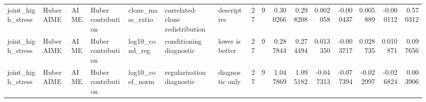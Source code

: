 \begin{table}[t]
\begin{tabular}{lllllllrrrrrrrrr}
joint_high_stress & HuberAIME & AIME & Huber contribution & clone_mass_ratio & correlated-clone redistribution & descriptive & 27 & 9 & 0.300266 & 0.298208 & 0.002058 & -0.000437 & 0.005889 & -0.000112 & 0.570312 \\
joint_high_stress & HuberAIME & AIME & Huber contribution & log10_cond_reg & conditioning diagnostic & lower is better & 27 & 9 & 0.287844 & 0.274494 & 0.013350 & -0.003717 & 0.028735 & 0.010871 & 0.097656 \\
joint_high_stress & HuberAIME & AIME & Huber contribution & log10_coef_norm & regularization diagnostic & diagnostic only & 27 & 9 & 1.047869 & 1.095182 & -0.047313 & -0.077394 & -0.022997 & -0.026824 & 0.003906 \\
\bottomrule
\end{tabular}
\end{table}

